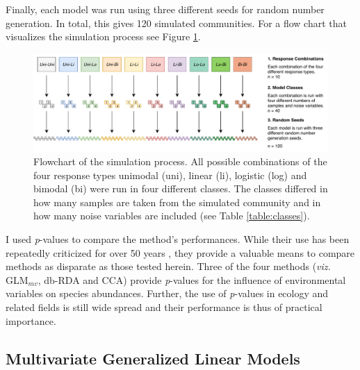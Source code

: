 	
		Finally, each model was run using three different seeds for random number generation. 
		In total, this gives 120 simulated communities. 
		For a flow chart that visualizes the simulation process see Figure \ref{fig:flowchart_simulation}.\\
		
		\begin{figure}[h!]
			\centering
			\includegraphics[width=1\linewidth]{../02_Figures/Flowchart}
			\caption{Flowchart of the simulation process. All possible combinations of the four response types unimodal (uni), linear (li), logistic (log) and bimodal (bi) were run in four different classes. The classes differed in how many samples are taken from the simulated community and in how many noise variables are included (see Table \ref{table:classes}).}
			\label{fig:flowchart_simulation}
		\end{figure}
	

		I used \textit{p}-values to compare the method's performances. While their use has been repeatedly criticized for over 50 years \citep[e.g.][]{rozeboom1960fallacy}, they provide a valuable means to compare methods as disparate as those tested herein. 
		Three of the four methods (\textit{viz.} GLM$_{mv}$, db-RDA and CCA) provide \textit{p}-values for the influence of environmental variables on species abundances. Further, the use of \textit{p}-values in ecology and related fields is still wide spread \citep{FIDLER2006} and their performance is thus of practical importance. \\


	\subsection{Multivariate Generalized Linear Models}

